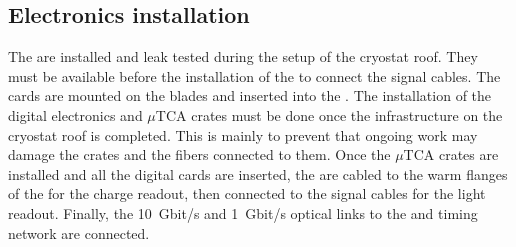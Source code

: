 \subsection{Electronics installation}
The  are installed and leak tested during the setup of the cryostat roof.
They must be available before the installation of the  to connect the signal cables.
The  cards are mounted on the blades and inserted into the .
The installation of the digital electronics and $\mu$TCA crates must be done once the infrastructure on the cryostat roof is completed.
This is mainly to prevent that ongoing work may damage the crates and the fibers connected to them.
Once the $\mu$TCA crates are installed and all the digital cards are inserted, the  are cabled to the warm flanges of the  for the charge readout, then connected to the  signal cables for the light readout.
Finally, the 10~Gbit/s and 1~Gbit/s optical links to the  and  timing network are connected.

